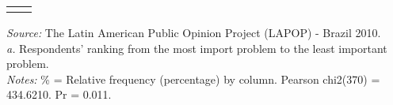 \documentclass{article}
\begin{document}
\begin{sidewaystable}
{\begin{tabular}{cc}
\bottomrule
\addlinespace[.75ex]
\end{tabular}
} %
\par
\scriptsize{\emph{Source: }The Latin American Public Opinion Project (LAPOP) - Brazil 2010.}\\
\scriptsize{\emph{a.} Respondents' ranking from the most import problem to the least important problem.}\\
\scriptsize{\emph{Notes:} \% = Relative frequency (percentage) by column.}
\scriptsize{Pearson chi2(370) = 434.6210. Pr = 0.011.}
\end{sidewaystable}
\end{document}
